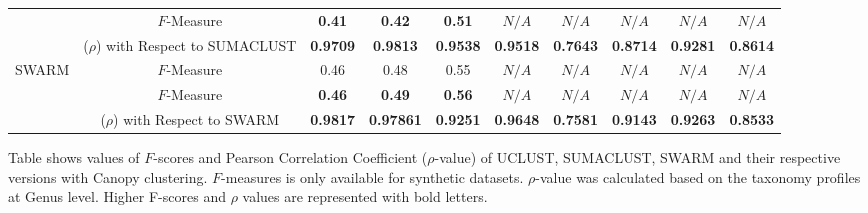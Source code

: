 \documentclass[letterpaper,twocolumn]{article}
\begin{document}
\begin{table}[t]
{\begin{tabular}{|l|c c c c| c c c c c|}
			\hdashline
			
			\multirow{2}{*}{CC$_{SUMACLUST}$} & $F$-Measure & \textbf{0.41} & \textbf{0.42} & \textbf{0.51} & $N/A$ & $N/A$ & $N/A$ & $N/A$ & $N/A$\\
			& ($\rho$) with Respect to SUMACLUST & \textbf{0.9709} & \textbf{0.9813} & \textbf{0.9538} & \textbf{0.9518} & \textbf{0.7643} & \textbf{0.8714} & \textbf{0.9281} & \textbf{0.8614}\\ 
			
			\hline
			
			\multirow{1}{*}{SWARM} & $F$-Measure & 0.46 & 0.48 & 0.55 & $N/A$ & $N/A$ & $N/A$ & $N/A$ & $N/A$\\
			
			\hdashline
			
			\multirow{2}{*}{CC$_{SWARM}$} & $F$-Measure & \textbf{0.46} & \textbf{0.49} & \textbf{0.56} & $N/A$ & $N/A$ & $N/A$ & $N/A$ & $N/A$\\
			& ($\rho$) with Respect to SWARM & \textbf{0.9817} & \textbf{0.97861} & \textbf{0.9251} & \textbf{0.9648} & \textbf{0.7581} & \textbf{0.9143} & \textbf{0.9263} & \textbf{0.8533}\\
			
			\hline
			
		\end{tabular}
	}
	\small
	\begin{tablenotes}
		\item Table shows values of $F$-scores and Pearson Correlation Coefficient ($\rho$-value) of UCLUST, SUMACLUST, SWARM and their respective versions with Canopy clustering. $F$-measures is only available for synthetic datasets. $\rho$-value was calculated based on the taxonomy profiles at Genus level. Higher F-scores and $\rho$ values are represented with bold letters.         
	\end{tablenotes}
	
\end{table}
\end{document}
